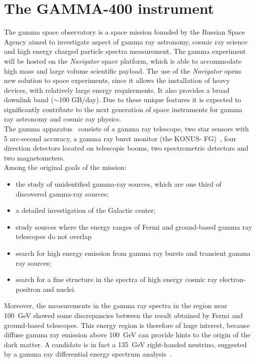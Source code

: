 \section{The GAMMA-400 instrument}
\label{sec:gamma400}
The \gls{gamma} space observatory is a space mission founded by the Russian
Space Agency aimed to investigate aspect of gamma ray astronomy, cosmic ray
science and high energy charged particle spectra measurement. The \gls{gamma}
experiment will be hosted on the {\em Navigator} space platform, which is able
to accommodate high mass and large volume scientific payload. The use of the
{\em Navigator} opens new solution to space experiments, since it allows the
installation of heavy devices, with relatively large energy requirements. It
also provides a broad downlink band ($\sim$100 GB/day). Due to these unique
features it is expected to significantly contribute to the next generation of
space instruments for gamma ray astronomy and cosmic ray physics.\\
The \gls{gamma} apparatus~\cite{Galper:2011bc} consists of a gamma ray
telescope, two star sensors with 5 arc-second accuracy, a gamma ray burst
monitor (the KONUS- FG)~\cite{Aptekar:2009sk}, four direction detectors located
on telescopic
booms, two spectrometric detectors and two magnetometers.\\
Among the original goals of the mission:
\begin{itemize}
\item the study of unidentified gamma-ray sources, which are one third of
  discovered gamma-ray sources;
\item a detailed investigation of the Galactic center;
\item study sources where the energy ranges of Fermi and ground-based gamma ray telescopes do not overlap
\item search for high energy emission from gamma ray bursts and transient
  gamma ray sources;
\item search for a fine structure in the spectra of high energy cosmic ray
  electron-positron and nuclei.
\end{itemize}
Moreover, the measurements in the gamma ray spectra in the region near 100~GeV
showed some discrepancies between the result obtained by Fermi and ground-based
telescopes. This energy region is therefore of huge interest, because diffuse
gamma ray emission above 100~GeV can provide hints to the origin of the dark
matter. A candidate is in fact a 135~GeV right-handed neutrino, suggested by a
gamma ray differential energy spectrum analysis~\cite{Bergstrom:2012bd}.\\
